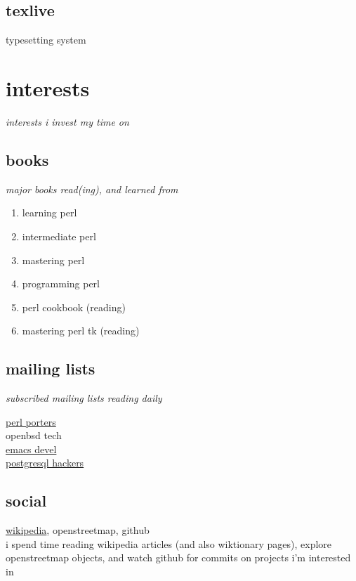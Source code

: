 \documentclass{article}
\begin{document}
\subsection{texlive}
typesetting system

  \section{interests}
  \textit{interests i invest my time on}
    \subsection{books}
      \textit{major books read(ing), and learned from}
      \begin{enumerate}
        \item{learning perl\cite{learning_perl}}
        \item{intermediate perl\cite{intermediate_perl}}
        \item{mastering perl\cite{mastering_perl}}
        \item{programming perl\cite{programming_perl}}
        \item{perl cookbook\cite{perl_cookbook}} (reading)
        \item{mastering perl tk\cite{perl_tk}} (reading)
      \end{enumerate}
    \subsection{mailing lists}
      \textit{subscribed mailing lists reading daily}
      \begin{description}
        \item[\href{https://lists.perl.org/list/perl5-porters.html}{perl porters}]
        \item[openbsd tech]
        \item[\href{https://lists.gnu.org/mailman/listinfo/emacs-devel}{emacs devel}]
        \item[\href{https://www.postgresql.org/list/pgsql-hackers/}{postgresql hackers}]
      \end{description}
\subsection{social}
\href{https://en.wikipedia.org/wiki/User:Rwp0}{wikipedia}, openstreetmap, github\\
i spend time reading wikipedia articles (and also wiktionary pages), explore openstreetmap objects, and watch github for commits  on projects i'm interested in
{} %
% 
\end{document}

